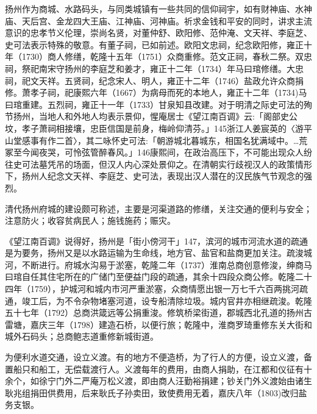 扬州作为商城、水路码头，与同类城镇有一些共同的信仰祠宇，如有财神庙、水神庙、天后宫、金龙四大王庙、江神庙、河神庙。祈求金钱和平安的同时，讲求主流意识的忠孝节义伦理，崇尚名贤，对董仲舒、欧阳修、范仲淹、文天祥、李庭芝、史可法表示特殊的敬意。有董子祠，已如前述。欧阳文忠祠，纪念欧阳修，雍正十年（1730）商人修缮，乾隆十五年（1751）众商重修。范文正祠，春秋二祭。双忠祠，祭祀南宋守扬州的李庭芝和姜才，雍正十二年（1734）年马曰琯修缮。大忠祠，祀文天祥。五贤祠，纪念宋人、明人，雍正十二年（1746）盐政允许众商捐修。萧孝子祠，祀康熙六年（1667）为病母而死的本地人，雍正十二年（1734)马曰琯重建。五烈祠，雍正十一年（1733）甘泉知县改建。对于明清之际史可法的殉节扬州，当地人和外地人均表示景仰，惺庵居士《望江南百调》云:「阁部史公坟，孝子萧祠相接壤，忠臣信国是前身，梅岭仰清芬。」145浙江人姜宸英的〈游平山堂感事有作二首〉，其二咏怀史可法:「朝游城北暮城东，相国名犹满域中。…荒冢至今闻夜哭，可怜弦管醉春风。」146康熙间，在政治高压下，不可能出现众人纷往史可法墓凭吊的场面，但汉人内心深处景仰之。在清朝实行歧视汉人的政策情形下，扬州人纪念文天祥、李庭芝、史可法，表现出汉人潜在的汉民族气节观念的强烈。

\vfill
\begin{BookNotes}
\end{BookNotes}


清代扬州府城的建设颇可称述，主要是河渠道路的修缮，关注交通的便利与安全；注意防火；收容贫病民人；施钱施药；赈灾。


《望江南百调》说得好，扬州是「街小傍河干」147，滨河的城市河流水道的疏通是为要务，扬州又是以水路运输为生命线，地方官、盐官和盐商更加关注。疏浚城河，不断进行。府城水沟易于淤塞，乾隆二年（1737）淮南总商创意修浚，绅商马曰琯自任其住宅所在的广储门至便益门段的疏通，其余十四段众商公修。乾隆二十四年（1759），护城河和城内市河严重淤塞，众商情愿出银一万七千六百两挑河疏通，竣工后，为不令杂物堵塞河道，设专船清除垃圾。城内官井亦相继疏浚。乾隆五十七年（1792）总商洪箴远等公捐重浚。修筑桥梁街道，郡城西北孔道的扬州古雷塘，嘉庆三年（1798）建造石桥，以便行旅；乾隆中，淮商罗琦重修东关大街和城外石码头；总商鲍志道重修新城街道。

为便利水道交通，设立义渡。有的地方不便造桥，为了行人的方便，设立义渡，备置船只和船工，无偿载渡行人。义渡每年的费用，由商人捐助，在江都和仪征有十余个，如徐宁门外二严庵万松义渡，即由商人汪勤裕捐建；钞关门外义渡始由诸生耿兆组捐田供费用，后来耿氏子孙卖田，致使费用无着，嘉庆八年（1803)改归盐务支银。

